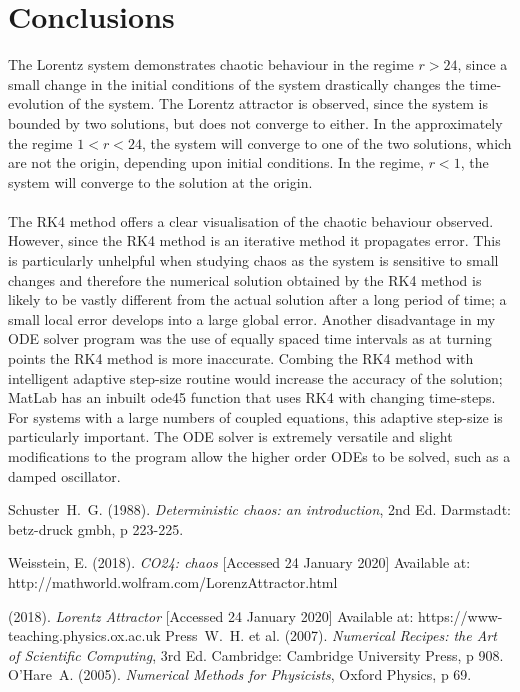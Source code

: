 \documentclass[a4paper,11pt]{article}
\begin{document}
\section{Conclusions}

The Lorentz system demonstrates chaotic behaviour in the regime $r>24$, since a small change in the initial conditions of the system drastically changes the time-evolution of the system. The Lorentz attractor is observed, since the system is bounded by two solutions, but does not converge to either. In the approximately the regime $1<r<24$, the system will converge to one of the two solutions, which are not the origin, depending upon initial conditions. In the regime, $r<1$, the system will converge to the solution at the origin.\\
\\
The RK4 method offers a clear visualisation of the chaotic behaviour observed. However, since the RK4 method is an iterative method it propagates error. This is particularly unhelpful when studying chaos as the system is sensitive to small changes and therefore the numerical solution obtained by the RK4 method is likely to be vastly different from the actual solution after a long period of time; a small local error develops into a large global error. Another disadvantage in my ODE solver program was the use of equally spaced time intervals as at turning points the RK4 method is more inaccurate. Combing the RK4 method with intelligent adaptive step-size routine would increase the accuracy of the solution; MatLab has an inbuilt ode45 function that uses RK4 with changing time-steps. For systems with a large numbers of coupled equations, this adaptive step-size is particularly important. The ODE solver is extremely versatile and slight modifications to the program allow the higher order ODEs to be solved, such as a damped oscillator. 




\begin{thebibliography}{9}
 Schuster\ H.\ G. (1988). \emph{Deterministic chaos: an introduction}, 2nd Ed. Darmstadt: betz-druck gmbh, p 223-225.

 Weisstein, E. (2018). \emph{CO24: chaos} [Accessed 24 January 2020] Available at: http://mathworld.wolfram.com/LorenzAttractor.html

 (2018). \emph{Lorentz Attractor} [Accessed 24 January 2020] Available at: https://www-teaching.physics.ox.ac.uk
 Press\ W.\ H. et al. (2007). \emph{Numerical Recipes: the Art of Scientific Computing}, 3rd Ed. Cambridge: Cambridge University Press, p 908. 
 O'Hare\ A. (2005). \emph{Numerical Methods for Physicists}, Oxford Physics, p 69. 
\end{thebibliography}
\end{document}
